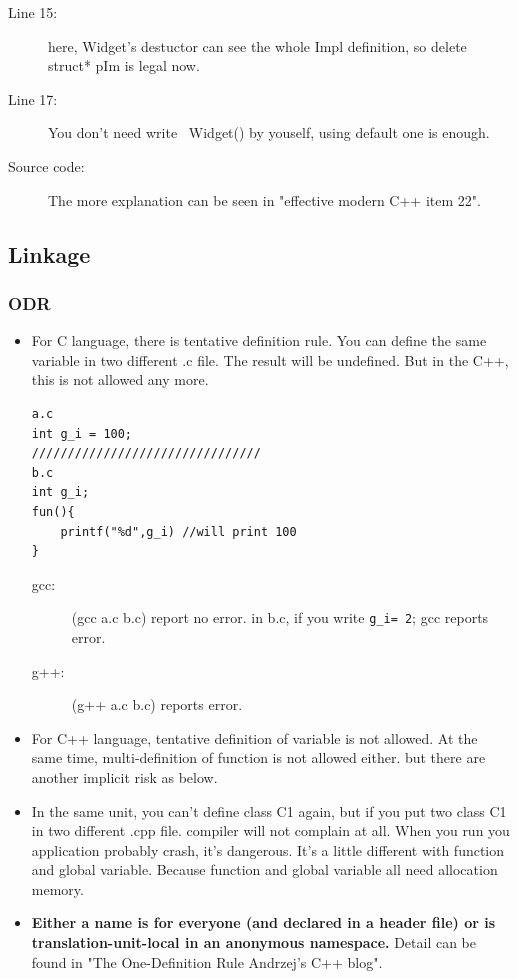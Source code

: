 \documentclass[a4paper,11pt,twoside]{book}
\begin{document}
\begin{itemize}
\begin{enumerate}
\begin{description}
	\item[Line 15:]here, Widget's destuctor can see the whole Impl definition, so delete struct* pIm is legal now.
	
	\item[Line 17:]You don't need write ~Widget() by youself, using default one is enough.
	
	\item[Source code:] The more explanation can be seen in "effective modern C++ item 22". 
\end{description}

	\end{enumerate}
\end{itemize}

\subsection{Linkage}

\subsubsection{ODR}
\begin{itemize}
	\item For C language, there is tentative definition rule. You can define the same variable in two different .c file. The result will be undefined. But in the C++, this is not allowed any more. 
	
\begin{lstlisting}[numbers=none]
a.c
int g_i = 100;
////////////////////////////////
b.c
int g_i;
fun(){
	printf("%d",g_i) //will print 100
}
\end{lstlisting}
	\begin{description}
		\item[gcc:] (gcc a.c b.c) report no error. in b.c, if you write \texttt{g\_i= 2}; gcc reports error.
		\item[g++:] (g++ a.c b.c) reports error.
	\end{description}

	\item For C++ language, tentative definition of variable is not allowed. At the same time, multi-definition of function is not allowed either. but there are another implicit risk as below. 
	
	\item In the same unit, you can't define class C1 again, but if you put two class C1 in two different .cpp file. compiler will not complain at all. When you run you application probably crash, it's dangerous. It's a little different with function and global variable. Because function and global variable all need allocation memory.
	
	\item \textbf{Either a name is for everyone (and declared in a header file) or is translation-unit-local in an anonymous namespace.} Detail can be found in "The One-Definition Rule  Andrzej's C++ blog".
\end{itemize}
\end{document}
